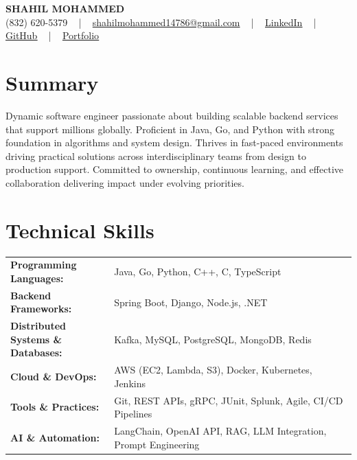 \documentclass[letterpaper,11pt]{article}
\begin{document}
\begin{center}
    {\fontsize{14pt}{12pt}\selectfont \textbf{\MakeUppercase{Shahil Mohammed}}}\\ \vspace{2pt}
    \fontsize{10pt}{12pt}\selectfont (832) 620-5379 ~ | ~ \href{mailto:shahilmohammed14786@gmail.com}{shahilmohammed14786@gmail.com} ~ | ~  
    \href{https://www.linkedin.com/in/shahil-mohammed-9652931a1/}{\color{blue}\underline{LinkedIn}}  ~ | ~ 
    \href{https://github.com/freakbeast14}{\color{blue}\underline{GitHub}} ~ | ~ 
    \href{https://shahil-mohammed.netlify.app/}{\color{blue}\underline{Portfolio}}
    \vspace{-8pt}
\end{center}

\section{Summary}
\fontsize{9pt}{10pt}\selectfont
Dynamic software engineer passionate about building scalable backend services that support millions globally. Proficient in Java, Go, and Python with strong foundation in algorithms and system design. Thrives in fast-paced environments driving practical solutions across interdisciplinary teams from design to production support. Committed to ownership, continuous learning, and effective collaboration delivering impact under evolving priorities.
 \vspace{-5pt}
 
\section{Technical Skills}
        \vspace{-14pt}
        \begin{table}[h]
            \fontsize{9pt}{10pt}\selectfont
            \begin{tabular}{p{0.3\linewidth} p{0.7\linewidth}}
                \textbf{Programming Languages:} & Java, Go, Python, C++, C, TypeScript \\
                \textbf{Backend Frameworks:} & Spring Boot, Django, Node.js, .NET \\
                \textbf{Distributed Systems \& Databases:} & Kafka, MySQL, PostgreSQL, MongoDB, Redis \\
                \textbf{Cloud \& DevOps:} & AWS (EC2, Lambda, S3), Docker, Kubernetes, Jenkins \\
                \textbf{Tools \& Practices:} & Git, REST APIs, gRPC, JUnit, Splunk, Agile, CI/CD Pipelines \\
                \textbf{AI \& Automation:} & LangChain, OpenAI API, RAG, LLM Integration, Prompt Engineering \\
            \end{tabular}
        \end{table}
 \vspace{-15pt}
 
\end{document}
